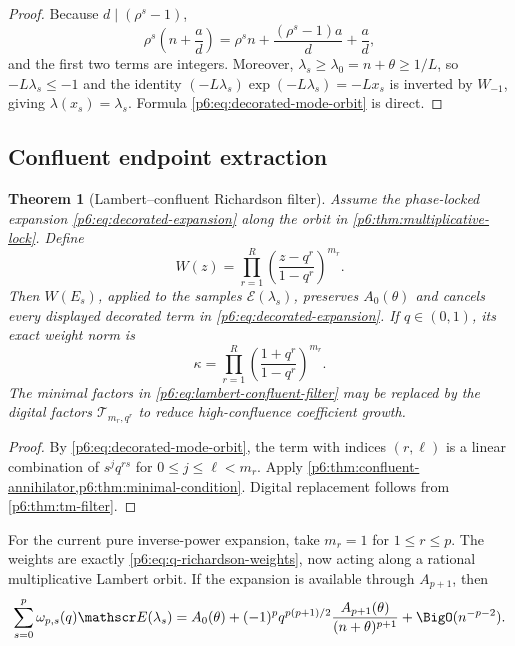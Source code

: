\documentclass[11pt]{article}
\numberwithin{equation}{section}
\newtheorem{theorem}{Theorem}[section]
\theoremstyle{definition}
\theoremstyle{remark}
\begin{document}
\begin{proof}
Because $d\mid(\rho^s-1)$,
\[
 \rho^s\left(n+\frac ad\right)
 =\rho^sn+\frac{(\rho^s-1)a}{d}+\frac ad,
\]
and the first two terms are integers.  Moreover,
$\lambda_s\ge\lambda_0=n+\theta\ge1/L$, so
$-L\lambda_s\le-1$ and the identity
$(-L\lambda_s)\exp(-L\lambda_s)=-Lx_s$ is inverted by $W_{-1}$, giving
$\lambda(x_s)=\lambda_s$.  Formula \eqref{p6:eq:decorated-mode-orbit} is direct.
\end{proof}

\subsection{Confluent endpoint extraction}

\begin{theorem}[Lambert--confluent Richardson filter]
\label{p6:thm:lambert-confluent}
Assume the phase-locked expansion \eqref{p6:eq:decorated-expansion} along the orbit in
\cref{p6:thm:multiplicative-lock}.  Define
\begin{equation}
 W(z)=\prod_{r=1}^{R}
 \left(\frac{z-q^r}{1-q^r}\right)^{m_r}.
 \label{p6:eq:lambert-confluent-filter}
\end{equation}
Then $W(E_s)$, applied to the samples
$\mathscr E(\lambda_s)$, preserves $A_0(\theta)$ and cancels every displayed decorated
term in \eqref{p6:eq:decorated-expansion}.  If $q\in(0,1)$, its exact weight norm is
\begin{equation}
 \kappa
 =\prod_{r=1}^{R}\left(\frac{1+q^r}{1-q^r}\right)^{m_r}.
 \label{p6:eq:lambert-confluent-condition}
\end{equation}
The minimal factors in \eqref{p6:eq:lambert-confluent-filter} may be replaced by the digital
factors $\mathcal T_{m_r,q^r}$ to reduce high-confluence coefficient growth.
\end{theorem}

\begin{proof}
By \eqref{p6:eq:decorated-mode-orbit}, the term with indices $(r,\ell)$ is a linear
combination of $s^jq^{rs}$ for $0\le j\le\ell<m_r$.  Apply
\cref{p6:thm:confluent-annihilator,p6:thm:minimal-condition}.  Digital replacement follows from
\cref{p6:thm:tm-filter}.
\end{proof}

For the current pure inverse-power expansion, take $m_r=1$ for $1\le r\le p$.  The
weights are exactly \eqref{p6:eq:q-richardson-weights}, now acting along a rational
multiplicative Lambert orbit.  If the expansion is available through $A_{p+1}$, then
\begin{equation}
 \sum_{s=0}^{p}\omega_{p,s}(q)\mathscr E(\lambda_s)
 =A_0(\theta)
 +(-1)^pq^{p(p+1)/2}\frac{A_{p+1}(\theta)}{(n+\theta)^{p+1}}
 +\BigO(n^{-p-2}).
 \label{p6:eq:multiplicative-leading-error}
\end{equation}
\end{document}
